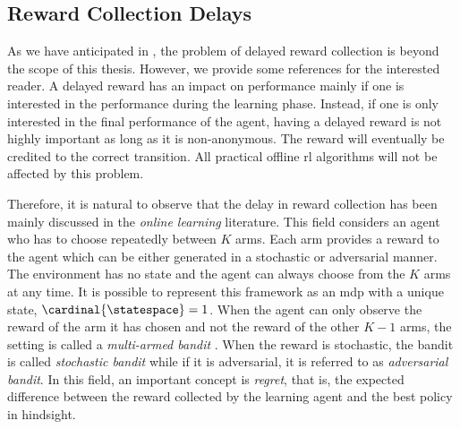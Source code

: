 \subsection{Reward Collection Delays}
\label{subsec:reward_delay_related}
As we have anticipated in , the problem of delayed reward collection is beyond the scope of this thesis. However, we provide some references for the interested reader. 
A delayed reward has an impact on performance mainly if one is interested in the performance during the learning phase. 
Instead, if one is only interested in the final performance of the agent, having a delayed reward is not highly important as long as it is non-anonymous. 
The reward will eventually be credited to the correct transition. 
All practical offline \gls{rl} algorithms will not be affected by this problem. 

Therefore, it is natural to observe that the delay in reward collection has been mainly discussed in the \emph{online learning} literature.
This field considers an agent who has to choose repeatedly between $K$ arms. 
Each arm provides a reward to the agent which can be either generated in a stochastic or adversarial manner. 
The environment has no state and the agent can always choose from the $K$ arms at any time. 
It is possible to represent this framework as an \gls{mdp} with a unique state, \ie $\cardinal{\statespace}=1$. 
When the agent can only observe the reward of the arm it has chosen and not the reward of the other $K-1$ arms, the setting is called a \emph{multi-armed bandit} \cite{lattimore2020bandit}. 
When the reward is stochastic, the bandit is called \emph{stochastic bandit} while if it is adversarial, it is referred to as \emph{adversarial bandit}.
In this field, an important concept is \emph{regret}, that is, the expected difference between the reward collected by the learning agent and the best policy in hindsight. 

